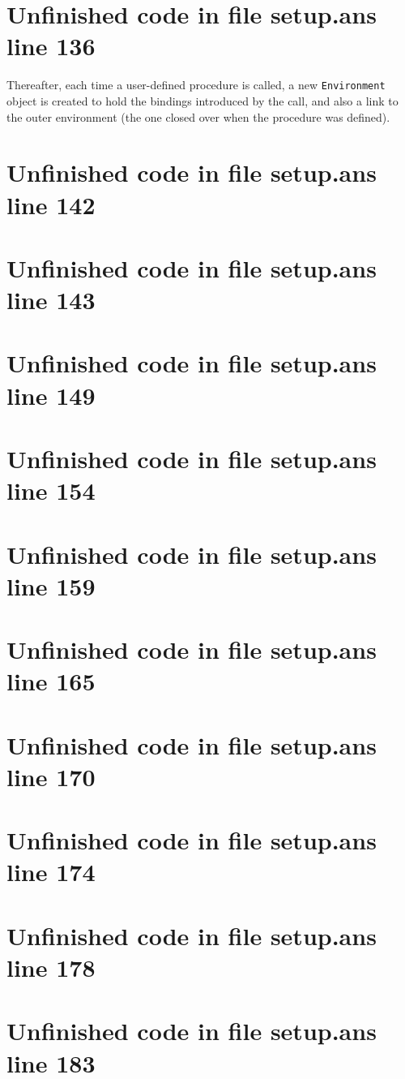 \documentclass[twoside,9pt]{report}
\begin{document}
\section{Unfinished code in file setup.ans line 136}


Thereafter, each time a user-defined procedure is called, a new \texttt{Environment} object is created to hold the bindings introduced by the call, and also a link to the outer environment (the one closed over when the procedure was defined).

\section{Unfinished code in file setup.ans line 142}
\section{Unfinished code in file setup.ans line 143}
\section{Unfinished code in file setup.ans line 149}
\section{Unfinished code in file setup.ans line 154}
\section{Unfinished code in file setup.ans line 159}
\section{Unfinished code in file setup.ans line 165}
\section{Unfinished code in file setup.ans line 170}
\section{Unfinished code in file setup.ans line 174}
\section{Unfinished code in file setup.ans line 178}
\section{Unfinished code in file setup.ans line 183}
\end{document}
